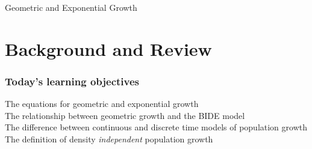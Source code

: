 \documentclass[color=usenames,dvipsnames]{beamer}\usepackage[]{graphicx}\usepackage[]{color}
\begin{document}


{
\begin{frame}[plain]
  \vspace{-4.2cm}
  \begin{center}
    {\huge Geometric and Exponential Growth } \\
  \end{center}
\end{frame}
}





\section{Background and Review}



\begin{frame}[plain]
  \frametitle{Today's learning objectives}
  \large
  The equations for geometric and exponential growth \\
  \pause
  \vfill
  The relationship between geometric growth and the BIDE model \\
  \pause
  \vfill
  The difference between continuous and discrete time models of
  population growth \\
  \pause
  \vfill
  The definition of density \textit{independent} population growth \\
\end{frame}
\end{document}
